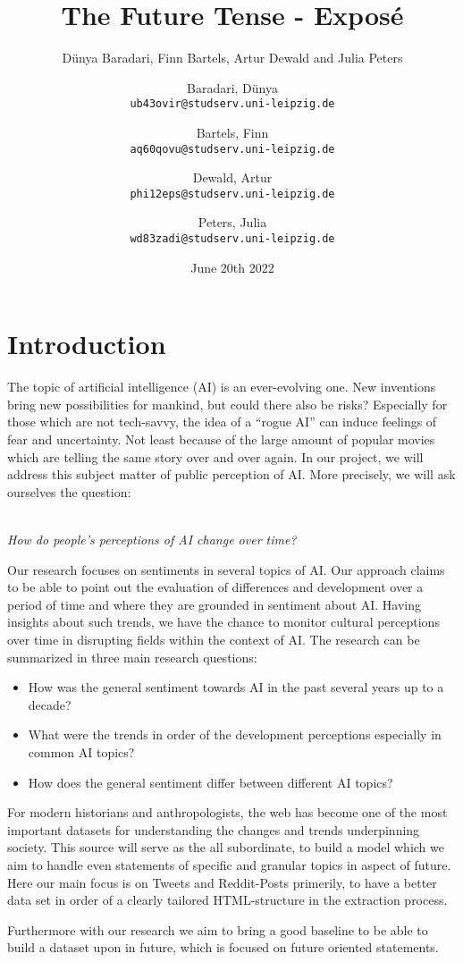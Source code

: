 \documentclass[11pt]{article}
\author{
  Dünya Baradari, Finn Bartels, Artur Dewald and Julia Peters
}
\author{
      Baradari, Dünya\\
      \texttt{ub43ovir@studserv.uni-leipzig.de}
      \and
      Bartels, Finn\\
      \texttt{aq60qovu@studserv.uni-leipzig.de}
      \and
      Dewald, Artur\\
      \texttt{phi12eps@studserv.uni-leipzig.de}
      \and
      Peters, Julia\\
      \texttt{wd83zadi@studserv.uni-leipzig.de}
    }
\title{The Future Tense - Exposé}
\date{June 20th 2022}
\begin{document}
\section{Introduction}

The topic of artificial intelligence (AI) is an ever-evolving one. New inventions bring new possibilities for mankind, but could there also be risks? Especially for those which are not tech-savvy, the idea of a “rogue AI” can induce feelings of fear and uncertainty. Not least because of the large amount of popular movies which are telling the same story over and over again. In our project, we will address this subject matter of public perception of AI. More precisely, we will ask ourselves the question:

\\ \textit{How do people’s perceptions of AI change over time?}

Our research focuses on sentiments in several topics of AI. Our approach claims to be able to point out the evaluation of differences and development over a period of time and where they  are grounded in sentiment about AI. Having insights about such trends, we have the chance to monitor cultural perceptions over time in disrupting fields within the context of AI. The research can be summarized in three main research questions:

\begin{itemize}
\item How was the general sentiment towards AI in the past several years up to a decade?
\item What were the trends in order of the development perceptions especially in common AI topics?
\item How does the general sentiment differ between different AI topics?
\end{itemize}

For modern historians and anthropologists, the web has become one of the most important datasets for understanding the changes and trends underpinning society. This source will serve as the all subordinate, to build a model which we aim to handle even statements of specific and granular topics in aspect of future. Here our main focus is on Tweets and Reddit-Posts primerily, to have a better data set in order of a clearly tailored HTML-structure in the extraction process.

Furthermore with our research we aim to bring a good baseline to be able to build a dataset upon in future, which is focused on future oriented statements.
\end{document}
